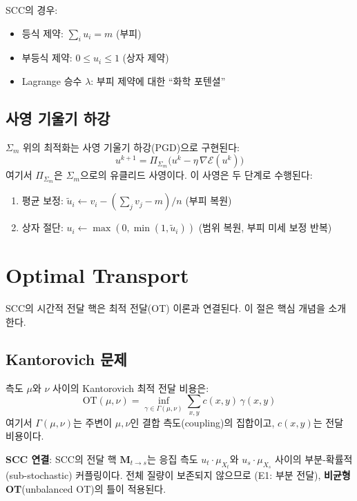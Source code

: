 SCC의 경우:
\begin{itemize}
    \item 등식 제약: $\sum_i u_i = m$ (부피)
    \item 부등식 제약: $0 \leq u_i \leq 1$ (상자 제약)
    \item Lagrange 승수 $\lambda$: 부피 제약에 대한 ``화학 포텐셜''
\end{itemize}


\subsection{사영 기울기 하강}

$\Sigma_m$ 위의 최적화는 사영 기울기 하강(PGD)으로 구현된다:
\begin{equation}
    u^{k+1} = \Pi_{\Sigma_m}\!\big(u^k - \eta\, \nabla \mathcal{E}(u^k)\big)
    \label{eq:pgd}
\end{equation}
여기서 $\Pi_{\Sigma_m}$은 $\Sigma_m$으로의 유클리드 사영이다. 이 사영은 두 단계로 수행된다:
\begin{enumerate}
    \item 평균 보정: $\tilde{u}_i \leftarrow v_i - (\sum_j v_j - m)/n$ (부피 복원)
    \item 상자 절단: $u_i \leftarrow \max(0, \min(1, \tilde{u}_i))$ (범위 복원, 부피 미세 보정 반복)
\end{enumerate}


\section{Optimal Transport}
\label{app:ot}

SCC의 시간적 전달 핵은 최적 전달(OT) 이론과 연결된다. 이 절은 핵심 개념을 소개한다.


\subsection{Kantorovich 문제}

측도 $\mu$와 $\nu$ 사이의 Kantorovich 최적 전달 비용은:
\begin{equation}
    \mathrm{OT}(\mu, \nu) = \inf_{\gamma \in \Gamma(\mu,\nu)} \sum_{x,y} c(x,y)\, \gamma(x,y)
    \label{eq:kantorovich}
\end{equation}
여기서 $\Gamma(\mu,\nu)$는 주변이 $\mu, \nu$인 결합 측도(coupling)의 집합이고, $c(x,y)$는 전달 비용이다.

\textbf{SCC 연결}: SCC의 전달 핵 $\mathbf{M}_{t \to s}$는 응집 측도 $u_t \cdot \mu_{X_t}$와 $u_s \cdot \mu_{X_s}$ 사이의 부분-확률적(sub-stochastic) 커플링이다. 전체 질량이 보존되지 않으므로 (E1: 부분 전달), \textbf{비균형 OT}(unbalanced OT)의 틀이 적용된다.


